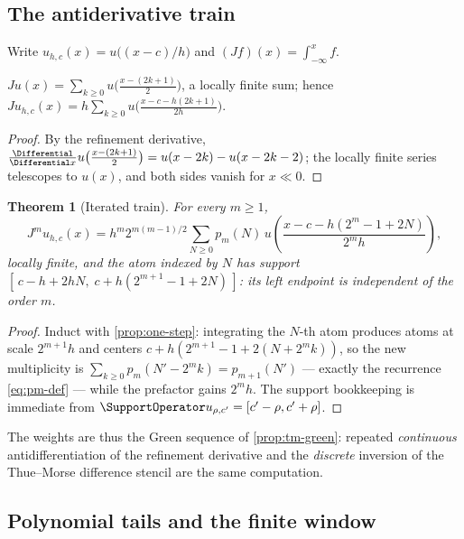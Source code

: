 \documentclass[11pt,oneside]{article}
\numberwithin{equation}{section}
\newtheorem{theorem}{Theorem}[section]
\theoremstyle{definition}
\theoremstyle{remark}
\begin{document}
\subsection{The antiderivative train}

Write $u_{h,c}(x)=u\bigl((x-c)/h\bigr)$ and
$(Jf)(x)=\int_{-\infty}^{x}f$.

\begin{proposition}
\label{prop:one-step}
$Ju(x)=\sum_{k\ge0}u\bigl(\tfrac{x-(2k+1)}2\bigr)$, a locally finite
sum; hence
$Ju_{h,c}(x)=h\sum_{k\ge0}
u\bigl(\tfrac{x-c-h(2k+1)}{2h}\bigr)$.
\end{proposition}

\begin{proof}
By the refinement derivative,
$\tfrac{\Differential}{\Differential x}u\bigl(\tfrac{x-(2k+1)}2\bigr)
=u(x-2k)-u(x-2k-2)$; the locally finite series telescopes to $u(x)$,
and both sides vanish for $x\ll0$.
\end{proof}

\begin{theorem}[Iterated train]
\label{thm:iterated-J}
For every $m\ge1$,
\begin{equation}
 \boxed{\;
 J^{m}u_{h,c}(x)
 =h^{m}2^{m(m-1)/2}
 \sum_{N\ge0}p_m(N)\,
 u\!\left(\frac{x-c-h(2^{m}-1+2N)}{2^{m}h}\right),
 \;}
 \label{eq:iterated-J}
\end{equation}
locally finite, and the atom indexed by $N$ has support
$[\,c-h+2hN,\;c+h(2^{m+1}-1+2N)\,]$: its \emph{left} endpoint is
independent of the order $m$.
\end{theorem}

\begin{proof}
Induct with \cref{prop:one-step}: integrating the $N$-th atom
produces atoms at scale $2^{m+1}h$ and centers
$c+h(2^{m+1}-1+2(N+2^{m}k))$, so the new multiplicity is
$\sum_{k\ge0}p_m(N'-2^{m}k)=p_{m+1}(N')$ --- exactly the recurrence
\eqref{eq:pm-def} --- while the prefactor gains $2^{m}h$.  The
support bookkeeping is immediate from
$\SupportOperator u_{\rho,c'}=[c'-\rho,c'+\rho]$.
\end{proof}

The weights are thus the Green sequence of
\cref{prop:tm-green}: repeated \emph{continuous} antidifferentiation
of the refinement derivative and the \emph{discrete} inversion of the
Thue--Morse difference stencil are the same computation.

\subsection{Polynomial tails and the finite window}
\end{document}
